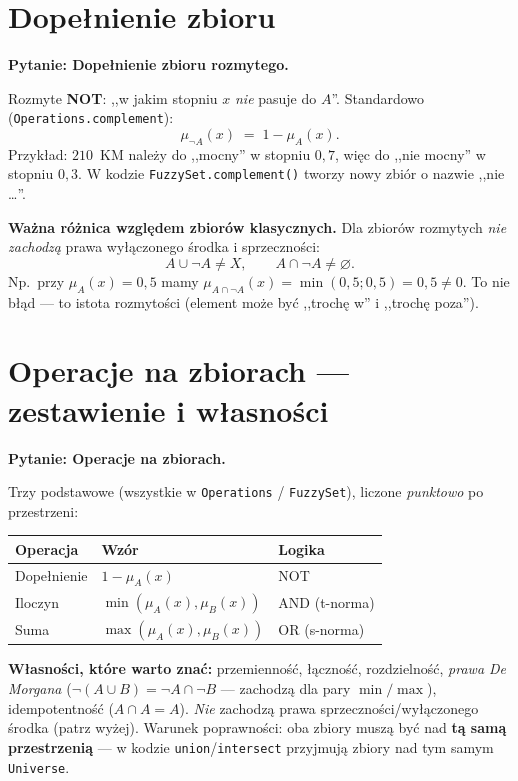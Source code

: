 \documentclass[11pt]{article}
\newcommand{\code}[1]{\texttt{#1}}
\newcommand{\pyt}[1]{\medskip\noindent\textbf{\textcolor{mkbg}{Pytanie:} #1}\par\smallskip}
\begin{document}
\section{Dopełnienie zbioru}

\pyt{Dopełnienie zbioru rozmytego.}

Rozmyte \textbf{NOT}: ,,w jakim stopniu $x$ \emph{nie} pasuje do $A$''. Standardowo
(\code{Operations.complement}):
\[
  \mu_{\neg A}(x) \;=\; 1 - \mu_A(x).
\]
Przykład: $210$~KM należy do ,,mocny'' w stopniu $0{,}7$, więc do ,,nie mocny'' w stopniu
$0{,}3$. W kodzie \code{FuzzySet.complement()} tworzy nowy zbiór o nazwie ,,nie \dots''.

\medskip
\textbf{Ważna różnica względem zbiorów klasycznych.} Dla zbiorów rozmytych
\emph{nie zachodzą} prawa wyłączonego środka i sprzeczności:
\[
  A \cup \neg A \neq X, \qquad A \cap \neg A \neq \varnothing.
\]
Np.\ przy $\mu_A(x)=0{,}5$ mamy $\mu_{A\cap\neg A}(x)=\min(0{,}5;0{,}5)=0{,}5\neq 0$. To
nie błąd --- to istota rozmytości (element może być ,,trochę w'' i ,,trochę poza'').

\section{Operacje na zbiorach --- zestawienie i własności}

\pyt{Operacje na zbiorach.}

Trzy podstawowe (wszystkie w \code{Operations} / \code{FuzzySet}), liczone
\emph{punktowo} po przestrzeni:
\begin{center}
\begin{tabular}{lll}
\toprule
Operacja & Wzór & Logika \\
\midrule
Dopełnienie & $1-\mu_A(x)$ & NOT \\
Iloczyn & $\min(\mu_A(x),\mu_B(x))$ & AND (t-norma) \\
Suma & $\max(\mu_A(x),\mu_B(x))$ & OR (s-norma) \\
\bottomrule
\end{tabular}
\end{center}

\textbf{Własności, które warto znać:} przemienność, łączność, rozdzielność,
\emph{prawa De Morgana} ($\neg(A\cup B)=\neg A\cap\neg B$ --- zachodzą dla pary
$\min/\max$), idempotentność ($A\cap A=A$). \emph{Nie} zachodzą prawa
sprzeczności/wyłączonego środka (patrz wyżej). Warunek poprawności: oba zbiory muszą być
nad \textbf{tą samą przestrzenią} --- w kodzie \code{union}/\code{intersect} przyjmują
zbiory nad tym samym \code{Universe}.
\end{document}
